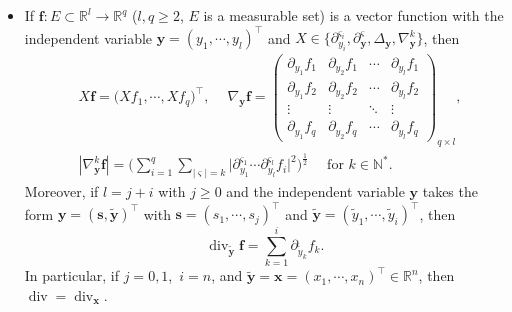 \documentclass[11pt,reqno]{amsart}
\DeclareMathOperator{\diver}{\mathrm{div}}
\numberwithin{rk}{section}
\numberwithin{prop}{section}
\numberwithin{mydef}{section}
\numberwithin{lem}{section}
\numberwithin{equation}{section}
\numberwithin{thm}{section}
\begin{document}
\begin{itemize}
\smallskip
\item If $\boldsymbol{f}: E\subset \mathbb{R}^l \to \mathbb{R}^q$ ($l,q\geq 2$, $E$ is a measurable set) is a vector function with the independent variable $\boldsymbol{y}=(y_1,\cdots\!,y_l)^\top$ and $X \in \{\partial_{y_i}^{\varsigma_i},\partial_{\boldsymbol{y}}^\varsigma,\Delta_{\boldsymbol{y}},\nabla_{\boldsymbol{y}}^k\}$, then 
\begin{align*}
&X\boldsymbol{f}=\big(Xf_1,\cdots\!,Xf_q\big)^\top, \ \quad \nabla_{\boldsymbol{y}}\boldsymbol{f}=\begin{pmatrix} 
\partial_{y_1} f_1 & \partial_{y_2} f_1 & \cdots & \partial_{y_l} f_1\\[2mm]
\partial_{y_1} f_2 & \partial_{y_2} f_2 & \cdots & \partial_{y_l} f_2 \\[2mm]
\vdots & \vdots & \ddots & \vdots \\[2mm]
\partial_{y_1} f_q & \partial_{y_2} f_q & \cdots & \partial_{y_l} f_q
\end{pmatrix}_{q\times l},\\
&|\nabla_{\boldsymbol{y}}^k \boldsymbol{f}|=\Big(\sum_{i=1}^q\sum_{|\varsigma|=k}\big|\partial_{y_1}^{\varsigma_1} \cdots\partial^{\varsigma_l}_{y_l}f_{i}\big|^2\Big)^\frac{1}{2} \quad \text{ for } k\in \mathbb{N}^*.
\end{align*}
Moreover, if $l=j+i$ with $j\geq 0$ and the independent variable $\boldsymbol{y}$ takes the form $\boldsymbol{y}=(\boldsymbol{s},\boldsymbol{\tilde{y}})^\top$ with $\boldsymbol{s}=(s_1,\cdots\!,s_j)^\top$ and $\boldsymbol{\tilde{y}}=(\tilde{y}_1,\cdots\!,\tilde{y}_i)^\top$, then
\begin{equation*}
\diver_{\boldsymbol{\tilde{y}}} \boldsymbol{f}=\sum_{k=1}^i \partial_{\tilde{y}_k}f_k.  
\end{equation*}
In particular, if $j=0,1$, $\,i=n$, and $\boldsymbol{\tilde{y}}=\boldsymbol{x}=(x_1,\cdots\!,x_n)^\top\in \mathbb{R}^n$, then $\diver=\diver_{\boldsymbol{x}}$.
\end{itemize}
\end{document}
